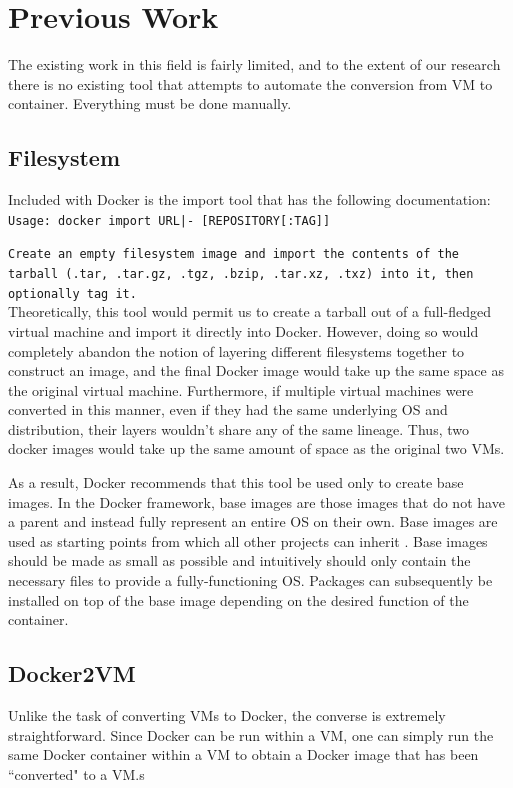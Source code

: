 \documentclass[\myfontsize, letterpaper]{article}
\begin{document}
\section{Previous Work}
\label{sec:prevwork}
The existing work in this field is fairly limited, and to the extent of our research there is no existing tool that attempts to automate the conversion from VM to container. Everything must be done manually.


\subsection{Filesystem}

Included with Docker is the import tool that has the following documentation:\\

\texttt{Usage: docker import URL|- [REPOSITORY[:TAG]]}

\texttt{Create an empty filesystem image and import the contents of the tarball (.tar, .tar.gz, .tgz, .bzip, .tar.xz, .txz) into it, then optionally tag it.} \\

Theoretically, this tool would permit us to create a tarball out of a full-fledged virtual machine and import it directly into Docker. However, doing so would completely abandon the notion of layering different filesystems together to construct an image, and the final Docker image would take up the same space as the original virtual machine. Furthermore, if multiple virtual machines were converted in this manner, even if they had the same underlying OS and distribution, their layers wouldn't share any of the same lineage. Thus, two docker images would take up the same amount of space as the original two VMs. 

As a result, Docker recommends that this tool be used only to create base images. In the Docker framework, base images are those images that do not have a parent and instead fully represent an entire OS on their own. Base images are used as starting points from which all other projects can inherit \cite{baseimage}. Base images should be made as small as possible and intuitively should only contain the necessary files to provide a fully-functioning OS. Packages can subsequently be installed on top of the base image depending on the desired function of the container. 

\subsection{Docker2VM}
Unlike the task of converting VMs to Docker, the converse is extremely straightforward. Since Docker can be run within a VM, one can simply run the same Docker container within a VM to obtain a Docker image that has been ``converted" to a VM.s
\end{document}
